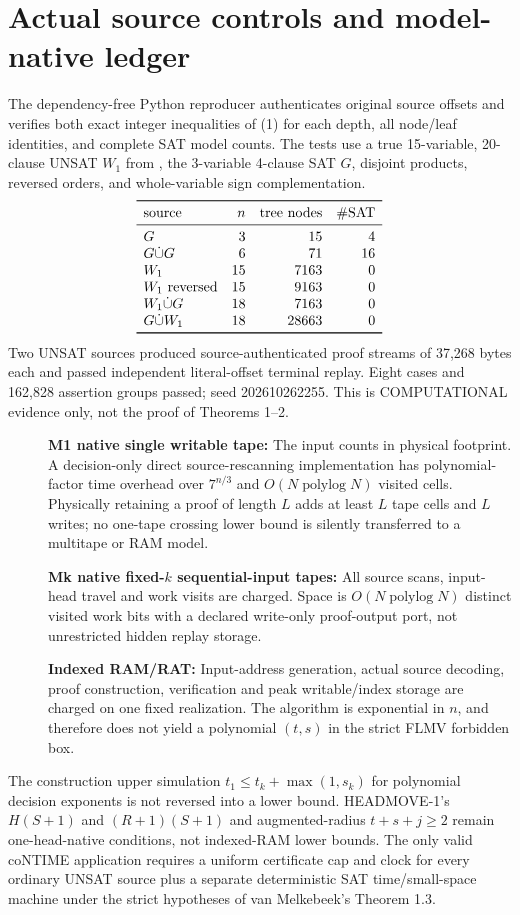 \documentclass[11pt]{article}
\begin{document}
\section{Actual source controls and model-native ledger}
The dependency-free Python reproducer authenticates original
source offsets and verifies both exact integer inequalities of (1)
for each depth, all node/leaf identities, and complete SAT model
counts. The tests use a true 15-variable, 20-clause UNSAT $W_1$
from ,
the 3-variable 4-clause SAT $G$, disjoint products, reversed orders,
and whole-variable sign complementation.
\[
\begin{array}{lrrr}
\toprule
\text{source}&n&\text{tree nodes}&\#\mathrm{SAT}\\\midrule
G&3&15&4\\
G\dot\cup G&6&71&16\\
W_1&15&7163&0\\
W_1\text{ reversed}&15&9163&0\\
W_1\dot\cup G&18&7163&0\\
G\dot\cup W_1&18&28663&0\\\bottomrule
\end{array}
\]
Two UNSAT sources produced source-authenticated proof streams of
37,268 bytes each and passed independent literal-offset terminal replay.
Eight cases and 162,828 assertion groups passed; seed 202610262255.
This is COMPUTATIONAL evidence only, not the proof of Theorems 1--2.

\begin{description}
\item[] \textbf{M1 native single writable tape:}
The input counts in physical footprint. A decision-only direct
source-rescanning implementation has polynomial-factor time overhead
over $7^{n/3}$ and $O(N\operatorname{polylog}N)$ visited cells.
Physically retaining a proof of length $L$ adds at least $L$
tape cells and $L$ writes; no one-tape crossing lower bound is
silently transferred to a multitape or RAM model.
\item[] \textbf{Mk native fixed-$k$ sequential-input tapes:}
All source scans, input-head travel and work visits are charged.
Space is $O(N\operatorname{polylog}N)$ distinct visited work
bits with a declared write-only proof-output port, not
unrestricted hidden replay storage.
\item[] \textbf{Indexed RAM/RAT:}
Input-address generation, actual source decoding, proof
construction, verification and peak writable/index storage
are charged on one fixed realization. The algorithm is
exponential in $n$, and therefore does not yield a polynomial
$(t,s)$ in the strict FLMV forbidden box.
\end{description}
The construction upper simulation $t_1\le t_k+\max(1,s_k)$ for
polynomial decision exponents is not reversed into a lower bound.
HEADMOVE-1's $H(S+1)$ and $(R+1)(S+1)$ and augmented-radius
$t+s+j\ge2$ remain one-head-native conditions, not indexed-RAM
lower bounds. The only valid coNTIME application requires a
uniform certificate cap and clock for every ordinary UNSAT
source plus a separate deterministic SAT time/small-space
machine under the strict hypotheses of van Melkebeek's Theorem 1.3.
\end{document}
